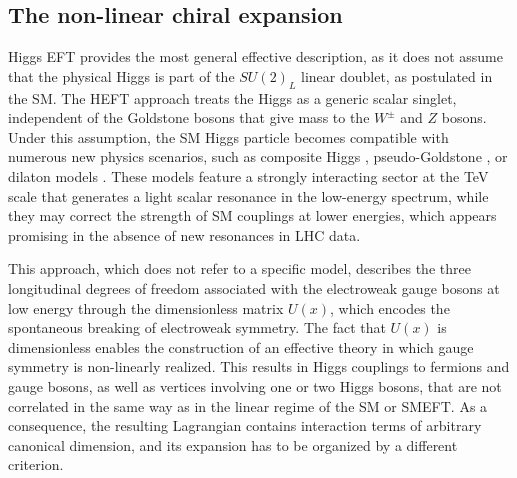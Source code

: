 \subsection{The non-linear chiral expansion}
\label{subsec:HEFT}
Higgs EFT provides the most general effective description, as it does not assume that the physical Higgs is part of the $SU(2)_L$ linear doublet, as postulated in the SM. The HEFT approach treats the Higgs as a generic scalar singlet, independent of the Goldstone bosons that give mass to the $W^{\pm}$ and $Z$ bosons. Under this assumption, the SM Higgs particle becomes compatible with numerous new physics scenarios, such as composite Higgs \cite{Kaplan:1983fs,Agashe:2004rs}, pseudo-Goldstone \cite{Kaplan:1983sm,Contino:2010mh}, or dilaton models \cite{Goldberger:2008zz,Chacko:2012sy}. These models feature a strongly interacting sector at the TeV scale that generates a light scalar resonance in the low-energy spectrum, while they may correct the strength of SM couplings at lower energies, which appears promising in the absence of new resonances in LHC data.

This approach, which does not refer to a specific model, describes the three longitudinal degrees of freedom associated with the electroweak gauge bosons at low energy through the dimensionless matrix $U(x)$, which encodes the spontaneous breaking of electroweak symmetry. The fact that $U(x)$ is dimensionless enables the construction of an effective theory in which gauge symmetry is non-linearly realized. This results in Higgs couplings to fermions and gauge bosons, as well as vertices involving one or two Higgs bosons, that are not correlated in the same way as in the linear regime of the SM or SMEFT. As a consequence, the resulting Lagrangian contains interaction terms of arbitrary canonical dimension, and its expansion has to be organized by a different criterion.



